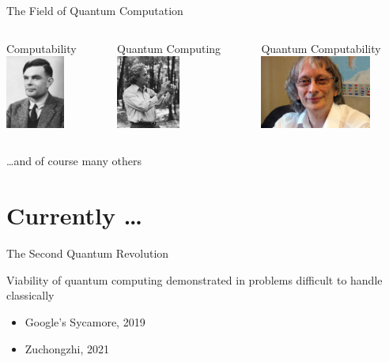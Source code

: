 \documentclass{beamer}
\begin{document}
\begin{frame}{The Field of Quantum Computation}
  \begin{columns}[c]
  \begin{column}{0.33\textwidth}
          \centering
          \small{Computability} \\
          \includegraphics[height=2.4cm]{images/turing.jpg}
  \end{column}
  \begin{column}{0.33\textwidth}
          \centering
          \small{Quantum Computing} \\
          \includegraphics[height=2.4cm]{images/feynman.jpg}
  \end{column}
  \begin{column}{0.4\textwidth}
          \centering
          \small{Quantum Computability} \\
          \includegraphics[height=2.4cm]{images/deutsch.jpg}
  \end{column}
  \end{columns}

  \vfill
  \dots and of course many others 
\end{frame}

\section{Currently \dots}

\begin{frame}{The Second Quantum Revolution}

        Viability of quantum computing demonstrated in problems difficult to
        handle classically 

        \begin{itemize}
        \item Google's Sycamore, 2019
        \item Zuchongzhi, 2021
        \end{itemize}

\end{frame}
\end{document}
